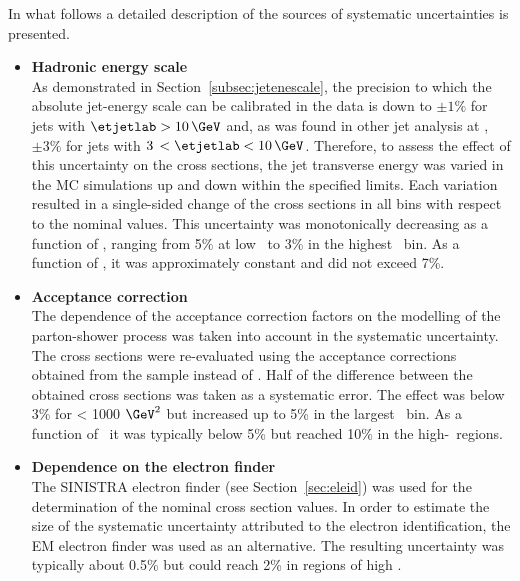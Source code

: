 In what follows a detailed description of the sources of systematic uncertainties is presented.
\begin{itemize}
	\item \textbf{Hadronic energy scale} \\
		As demonstrated in Section~\ref{subsec:jetenescale}, the precision to which the absolute jet-energy scale can be calibrated in the data is down to $\pm1\%$ for jets with $\etjetlab > 10\,\GeV$ and, as was found in other jet analysis at \zeus, $\pm3\%$ for jets with $3\,< \etjetlab < 10\,\GeV$. Therefore, to assess the effect of this uncertainty on the cross sections, the jet transverse energy was varied in the MC simulations up and down within the specified limits. Each variation resulted in a single-sided change of the cross sections in all bins with respect to the nominal values. This uncertainty was monotonically decreasing as a function of \qsq, ranging from 5\% at low \qsq~to 3\% in the highest \qsq~bin. As a function of \etjetb, it was approximately constant and did not exceed 7\%.
		
	\item \textbf{Acceptance correction} \\
		The dependence of the acceptance correction factors on the modelling of the parton-shower process was taken into account in the systematic uncertainty. The cross sections were re-evaluated using the acceptance corrections obtained from the \ariadne sample instead of \lepto. Half of the difference between the obtained cross sections was taken as a systematic error. The effect was below 3\% for \qsq < 1000 $\GeV^2$ but increased up to 5\% in the largest \qsq~bin. As a function of \etjetb~it was typically below 5\% but reached 10\% in the high-\etjetb~regions.
			
	\item \textbf{Dependence on the electron finder}\\
		The \textsc{SINISTRA} electron finder (see Section~\ref{sec:eleid}) was used for the determination of the nominal cross section values. In order to estimate the size of the systematic uncertainty attributed to the electron identification, the \textsc{EM} electron finder was used as an alternative. The resulting uncertainty was typically about 0.5\% but could reach 2\% in regions of high \qsq.
	

\end{itemize}
